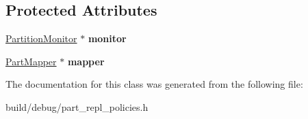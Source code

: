 \subsection*{Protected Attributes}
\begin{DoxyCompactItemize}
\item 
\hypertarget{classPartReplPolicy_a9cf29e06cfa01917246548ad2cfda510}{\hyperlink{classPartitionMonitor}{Partition\-Monitor} $\ast$ {\bfseries monitor}}\label{classPartReplPolicy_a9cf29e06cfa01917246548ad2cfda510}

\item 
\hypertarget{classPartReplPolicy_a16d000b99f0e3c67a07c71f16a3f0bd6}{\hyperlink{classPartMapper}{Part\-Mapper} $\ast$ {\bfseries mapper}}\label{classPartReplPolicy_a16d000b99f0e3c67a07c71f16a3f0bd6}

\end{DoxyCompactItemize}


The documentation for this class was generated from the following file\-:\begin{DoxyCompactItemize}
\item 
build/debug/part\-\_\-repl\-\_\-policies.\-h\end{DoxyCompactItemize}
